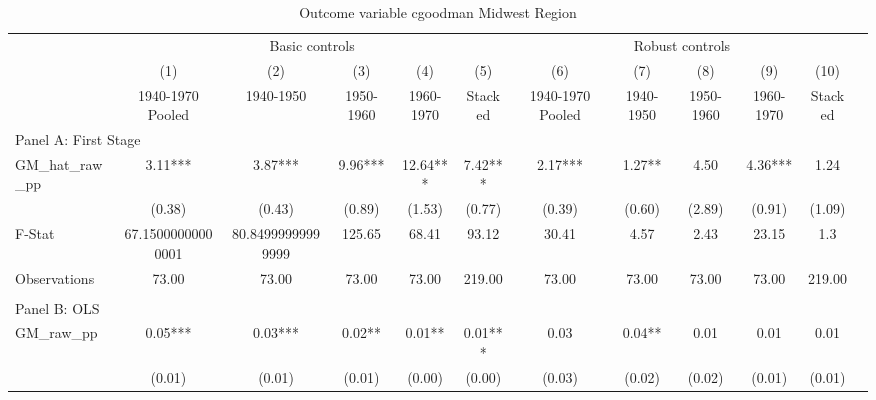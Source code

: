  \begin{table}[htbp]\centering {} \begin{threeparttable} \caption{Outcome variable cgoodman Midwest Region} \begin{tabular}{l*{11}{c}} \toprule
          &\multicolumn{5}{c}{Basic controls}                                   &\multicolumn{5}{c}{Robust controls}                                  \\\cmidrule(lr){2-6}\cmidrule(lr){7-11}
          &\multicolumn{1}{c}{(1)}&\multicolumn{1}{c}{(2)}&\multicolumn{1}{c}{(3)}&\multicolumn{1}{c}{(4)}&\multicolumn{1}{c}{(5)}&\multicolumn{1}{c}{(6)}&\multicolumn{1}{c}{(7)}&\multicolumn{1}{c}{(8)}&\multicolumn{1}{c}{(9)}&\multicolumn{1}{c}{(10)}\\
          &\multicolumn{1}{c}{1940-1970 Pooled}&\multicolumn{1}{c}{1940-1950}&\multicolumn{1}{c}{1950-1960}&\multicolumn{1}{c}{1960-1970}&\multicolumn{1}{c}{Stacked}&\multicolumn{1}{c}{1940-1970 Pooled}&\multicolumn{1}{c}{1940-1950}&\multicolumn{1}{c}{1950-1960}&\multicolumn{1}{c}{1960-1970}&\multicolumn{1}{c}{Stacked}\\
\cmidrule(lr){1-11}
\multicolumn{10}{l}{Panel A: First Stage}\\
\cmidrule(lr){1-11}
GM\_hat\_raw\_pp&      3.11***&      3.87***&      9.96***&     12.64***&      7.42***&      2.17***&      1.27** &      4.50   &      4.36***&      1.24   \\
          &    (0.38)   &    (0.43)   &    (0.89)   &    (1.53)   &    (0.77)   &    (0.39)   &    (0.60)   &    (2.89)   &    (0.91)   &    (1.09)   \\
\midrule
F-Stat    &67.15000000000001   &80.84999999999999   &    125.65   &     68.41   &     93.12   &     30.41   &      4.57   &      2.43   &     23.15   &       1.3   \\
Observations&     73.00   &     73.00   &     73.00   &     73.00   &    219.00   &     73.00   &     73.00   &     73.00   &     73.00   &    219.00   \\
\cmidrule[\heavyrulewidth](lr){1-11} \\ \cmidrule[\heavyrulewidth](lr){1-11}
\multicolumn{10}{l}{Panel B: OLS}\\
\cmidrule(lr){1-11}
GM\_raw\_pp &      0.05***&      0.03***&      0.02** &      0.01** &      0.01***&      0.03   &      0.04** &      0.01   &      0.01   &      0.01   \\
          &    (0.01)   &    (0.01)   &    (0.01)   &    (0.00)   &    (0.00)   &    (0.03)   &    (0.02)   &    (0.02)   &    (0.01)   &    (0.01)   \\

\end{tabular}
\end{threeparttable}
\end{table}
